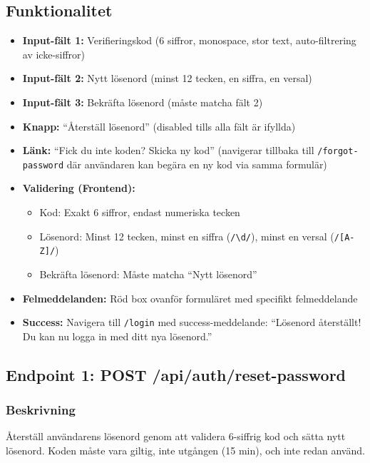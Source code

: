 \documentclass[12pt,a4paper]{article}
\begin{document}
\subsection{Funktionalitet}
\begin{itemize}[noitemsep]
  \item \textbf{Input-fält 1:} Verifieringskod (6 siffror, monospace, stor text, 
  auto-filtrering av icke-siffror)
  \item \textbf{Input-fält 2:} Nytt lösenord (minst 12 tecken, en siffra, en versal)
  \item \textbf{Input-fält 3:} Bekräfta lösenord (måste matcha fält 2)
  \item \textbf{Knapp:} ``Återställ lösenord'' (disabled tills alla fält är ifyllda)
  \item \textbf{Länk:} ``Fick du inte koden? Skicka ny kod'' (navigerar tillbaka till 
  \texttt{/forgot-password} där användaren kan begära en ny kod via samma formulär)
  \item \textbf{Validering (Frontend):}
  \begin{itemize}[noitemsep]
    \item Kod: Exakt 6 siffror, endast numeriska tecken
    \item Lösenord: Minst 12 tecken, minst en siffra (\texttt{/\textbackslash{}d/}), minst en versal (\texttt{/[A-Z]/})
    \item Bekräfta lösenord: Måste matcha ``Nytt lösenord''
  \end{itemize}
  \item \textbf{Felmeddelanden:} Röd box ovanför formuläret med specifikt felmeddelande
  \item \textbf{Success:} Navigera till \texttt{/login} med success-meddelande: ``Lösenord återställt! Du kan nu logga in med ditt nya lösenord.''
\end{itemize}

\subsection{Endpoint 1: POST /api/auth/reset-password}

\subsubsection{Beskrivning}
Återställ användarens lösenord genom att validera 6-siffrig kod och sätta nytt lösenord. Koden måste vara giltig, inte utgången (15 min), och inte redan använd.
\end{document}

